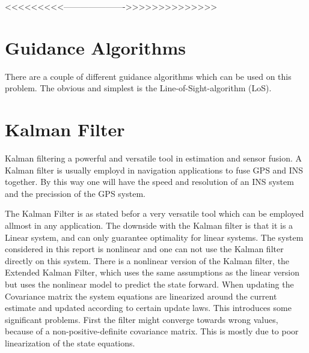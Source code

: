 	<<<<<<<<<---------------------->>>>>>>>>>>>>>

\section{Guidance Algorithms}
	There are a couple of different guidance algorithms which can be used on this problem. The obvious and simplest is the Line-of-Sight-algorithm (LoS). 	
		

\section{Kalman Filter}
	Kalman filtering a powerful and versatile tool in estimation and sensor fusion. A Kalman filter is usually employd in navigation applications to fuse GPS and INS together. By this way one will have the speed and resolution of an INS system and the precission of the GPS system. 

	The Kalman Filter is as stated befor a very versatile tool which can be employed allmost in any application. The downside with the Kalman filter is that it is a Linear system, and can only guarantee optimality for linear systems. The system considered in this report is nonlinear and one can not use the Kalman filter directly on this system. There is a nonlinear version of the Kalman filter, the Extended Kalman Filter, which uses the same assumptions as the linear version but uses the nonlinear model to predict the state forward. When updating the Covariance matrix the system equations are linearized around the current estimate and updated according to certain update laws. This introduces some significant problems. First the filter might converge towards wrong values, because of a non-positive-definite covariance matrix. This is mostly due to poor linearization of the state equations. \cite{kalman}
	
	
	

